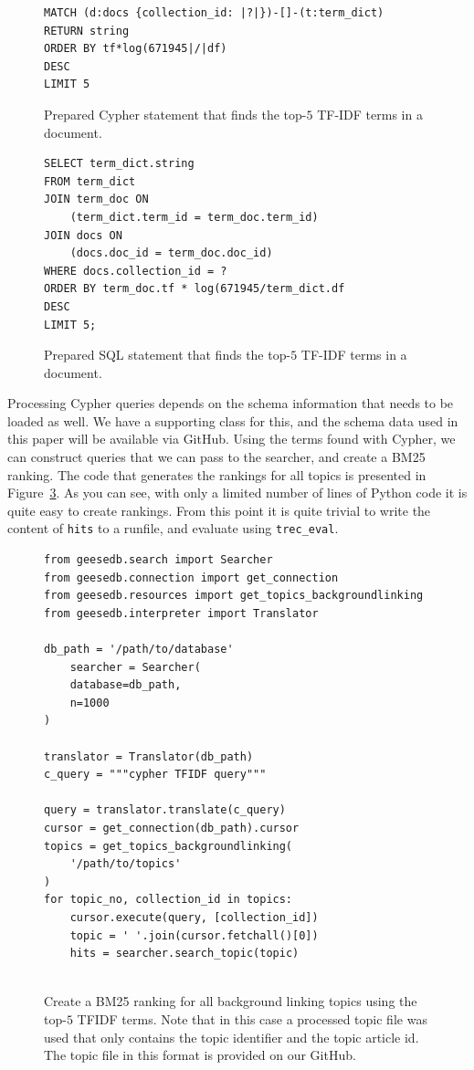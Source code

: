 \begin{figure}
	\begin{verbatim}
MATCH (d:docs {collection_id: |?|})-[]-(t:term_dict)
RETURN string
ORDER BY tf*log(671945|/|df)
DESC
LIMIT 5
	\end{verbatim}
	\caption{Prepared Cypher statement that finds the top-$5$ TF-IDF terms in a document.}
	\label{fig:tfidf-cypher}
\end{figure}
\begin{figure}
	\begin{verbatim}
SELECT term_dict.string
FROM term_dict
JOIN term_doc ON 
	(term_dict.term_id = term_doc.term_id)
JOIN docs ON 
	(docs.doc_id = term_doc.doc_id)
WHERE docs.collection_id = ?
ORDER BY term_doc.tf * log(671945/term_dict.df
DESC
LIMIT 5;
	\end{verbatim}
	\caption{Prepared SQL statement that finds the top-$5$ TF-IDF terms in a document.}
	\label{fig:tfidf}
\end{figure}
Processing Cypher queries depends on the schema information that needs to be loaded as well. We have a supporting class for this, and the schema data used in this paper will be available via GitHub. Using the terms found with Cypher, we can construct queries that we can pass to the searcher, and create a BM25 ranking. The code that generates the rankings for all topics is presented in Figure~\ref{fig:code_bm25_background_linking}. As you can see, with only a limited number of lines of Python code it is quite easy to create rankings. From this point it is quite trivial to write the content of \texttt{hits} to a runfile, and evaluate using \texttt{trec\_eval}. 

\begin{figure}
	\begin{verbatim}
from geesedb.search import Searcher
from geesedb.connection import get_connection
from geesedb.resources import get_topics_backgroundlinking
from geesedb.interpreter import Translator

db_path = '/path/to/database'
	searcher = Searcher(
	database=db_path, 
	n=1000
)

translator = Translator(db_path)
c_query = """cypher TFIDF query"""

query = translator.translate(c_query)
cursor = get_connection(db_path).cursor
topics = get_topics_backgroundlinking(
	'/path/to/topics'
)
for topic_no, collection_id in topics:
	cursor.execute(query, [collection_id])
	topic = ' '.join(cursor.fetchall()[0])
	hits = searcher.search_topic(topic)
	
	\end{verbatim}
	\caption{Create a BM25 ranking for all background linking topics using the top-$5$ TFIDF terms. Note that in this case a processed topic file was used that only contains the topic identifier and the topic article id. The topic file in this format is provided on our GitHub.}
	\label{fig:code_bm25_background_linking}
\end{figure}

